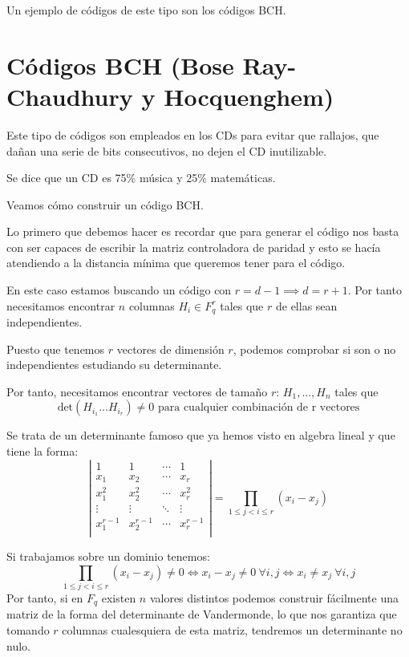 Un ejemplo de códigos de este tipo son los códigos BCH.

\section{Códigos BCH (Bose Ray-Chaudhury y Hocquenghem)}

Este tipo de códigos son empleados en los CDs para evitar que rallajos, que dañan una serie de bits consecutivos, no dejen el CD inutilizable.

Se dice que un CD es 75\% música y 25\% matemáticas.

Veamos cómo construir un código BCH.

Lo primero que debemos hacer es recordar que para generar el código nos basta con ser capaces de escribir la matriz controladora de paridad y esto se hacía atendiendo a la distancia mínima que queremos tener para el código.

En este caso estamos buscando un código con $r=d-1 \implies d=r+1$. Por tanto necesitamos encontrar $n$ columnas $H_i \in F_q^r$ tales que $r$ de ellas sean independientes.

Puesto que tenemos $r$ vectores de dimensión $r$, podemos comprobar si son o no independientes estudiando su determinante.

Por tanto, necesitamos encontrar vectores de tamaño $r$: $H_1,...,H_n$ tales que
\[\text{det}(H_{i_1}...H_{i_r}) \neq 0 \text{ para cualquier combinación de r vectores}\]

\begin{defn}
Se trata de un determinante famoso que ya hemos visto en algebra lineal y que tiene la forma:
\[\left| \begin{array}{cccc}
1 & 1 & \cdots & 1 \\
x_1 & x_2 & \cdots & x_r \\
x_1^2 & x_2^2 & \cdots & x_r^2 \\
\vdots & \vdots & \ddots & \vdots \\
x_1^{r-1} & x_2^{r-1} & \cdots & x_r^{r-1} \\
\end{array}\right| = \prod_{1 \leq j < i \leq r}(x_i-x_j)\]
\end{defn}

Si trabajamos sobre un dominio tenemos:
\[\prod_{1 \leq j < i \leq r}(x_i-x_j) \neq 0 \iff x_i-x_j \neq 0 \ \forall i,j \iff x_i\neq x_j  \ \forall i,j\]
Por tanto, si en $F_q$ existen $n$ valores distintos podemos construir fácilmente una matriz de la forma del determinante de Vandermonde, lo que nos garantiza que tomando $r$ columnas cualesquiera de esta matriz, tendremos un determinante no nulo.

